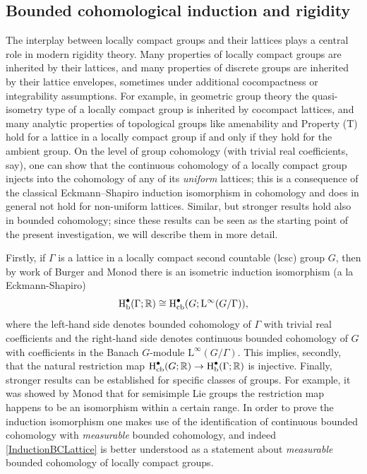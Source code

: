\documentclass[11pt, oneside]{amsart}
\theoremstyle{definition}
\theoremstyle{remark}
\theoremstyle{TheoremNum}
\newcommand{\Hb}{\textup{H}_{\textup{b}}}
\newcommand{\Hcb}{\textup{H}_{\textup{cb}}}
\newcommand{\Linf}{\mathrm{L}^{\infty}}
\newcommand{\bR}{\mathbb{R}}
\begin{document}
\subsection{Bounded cohomological induction and rigidity}

The interplay between locally compact groups and their lattices plays a central role in modern rigidity theory. Many properties of locally compact groups are inherited by their lattices, and many properties of discrete groups are inherited by their lattice envelopes, sometimes under additional cocompactness or integrability assumptions. For example, in geometric group theory the quasi-isometry type of a locally compact group is inherited by cocompact lattices, and many analytic properties of topological groups like amenability and Property (T) hold for a lattice in a locally compact group if and only if they hold for the ambient group. On the level of group cohomology (with trivial real coefficients, say), one can show that the continuous cohomology of a locally compact group injects into the cohomology of any of its \emph{uniform} lattices; this is a consequence of the classical Eckmann--Shapiro induction isomorphism in cohomology and does in general not hold for
non-uniform lattices. Similar, but stronger results hold also in bounded cohomology; since these results can be seen as the starting point of the present investigation, we will describe them in more detail.

Firstly, if $\Gamma$ is a lattice in a locally compact second countable (lcsc) group $G$, then by work of Burger and Monod \cite{BuMo} there is an isometric induction isomorphism (a la Eckmann-Shapiro)
\begin{equation}\label{InductionBCLattice}
\Hb^\bullet(\Gamma; \bR) \cong \Hcb^\bullet(G; \Linf (G/\Gamma)),
\end{equation}
where the left-hand side denotes bounded cohomology of $\Gamma$ with trivial real coefficients and the right-hand side denotes continuous bounded cohomology of $G$ with coefficients in the Banach $G$-module $\Linf (G/\Gamma)$. This implies, secondly, that the natural restriction map $\Hcb^\bullet(G; \bR) \to \Hb^\bullet(\Gamma; \bR)$ is injective. Finally, stronger results can be established for specific classes of groups. For example, it was showed by Monod \cite{MonodSarithmetic} that for semisimple Lie groups the restriction map happens to be an isomorphism within a certain range. In order to prove the induction isomorphism one makes use of the identification of continuous bounded cohomology with \emph{measurable} bounded cohomology, and indeed \eqref{InductionBCLattice} is better understood as a statement about \emph{measurable} bounded cohomology of locally compact groups.
\end{document}
